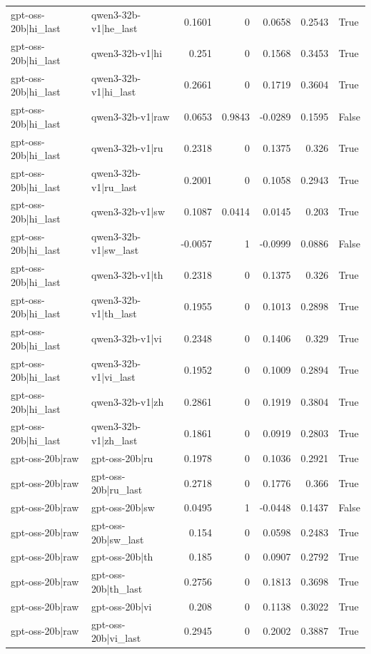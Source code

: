 \begin{table}
\begin{tabular}{l l r r r r l}
gpt-oss-20b|hi_last & qwen3-32b-v1|he_last & 0.1601 & 0 & 0.0658 & 0.2543 & True \\
gpt-oss-20b|hi_last & qwen3-32b-v1|hi & 0.251 & 0 & 0.1568 & 0.3453 & True \\
gpt-oss-20b|hi_last & qwen3-32b-v1|hi_last & 0.2661 & 0 & 0.1719 & 0.3604 & True \\
gpt-oss-20b|hi_last & qwen3-32b-v1|raw & 0.0653 & 0.9843 & -0.0289 & 0.1595 & False \\
gpt-oss-20b|hi_last & qwen3-32b-v1|ru & 0.2318 & 0 & 0.1375 & 0.326 & True \\
gpt-oss-20b|hi_last & qwen3-32b-v1|ru_last & 0.2001 & 0 & 0.1058 & 0.2943 & True \\
gpt-oss-20b|hi_last & qwen3-32b-v1|sw & 0.1087 & 0.0414 & 0.0145 & 0.203 & True \\
gpt-oss-20b|hi_last & qwen3-32b-v1|sw_last & -0.0057 & 1 & -0.0999 & 0.0886 & False \\
gpt-oss-20b|hi_last & qwen3-32b-v1|th & 0.2318 & 0 & 0.1375 & 0.326 & True \\
gpt-oss-20b|hi_last & qwen3-32b-v1|th_last & 0.1955 & 0 & 0.1013 & 0.2898 & True \\
gpt-oss-20b|hi_last & qwen3-32b-v1|vi & 0.2348 & 0 & 0.1406 & 0.329 & True \\
gpt-oss-20b|hi_last & qwen3-32b-v1|vi_last & 0.1952 & 0 & 0.1009 & 0.2894 & True \\
gpt-oss-20b|hi_last & qwen3-32b-v1|zh & 0.2861 & 0 & 0.1919 & 0.3804 & True \\
gpt-oss-20b|hi_last & qwen3-32b-v1|zh_last & 0.1861 & 0 & 0.0919 & 0.2803 & True \\
gpt-oss-20b|raw & gpt-oss-20b|ru & 0.1978 & 0 & 0.1036 & 0.2921 & True \\
gpt-oss-20b|raw & gpt-oss-20b|ru_last & 0.2718 & 0 & 0.1776 & 0.366 & True \\
gpt-oss-20b|raw & gpt-oss-20b|sw & 0.0495 & 1 & -0.0448 & 0.1437 & False \\
gpt-oss-20b|raw & gpt-oss-20b|sw_last & 0.154 & 0 & 0.0598 & 0.2483 & True \\
gpt-oss-20b|raw & gpt-oss-20b|th & 0.185 & 0 & 0.0907 & 0.2792 & True \\
gpt-oss-20b|raw & gpt-oss-20b|th_last & 0.2756 & 0 & 0.1813 & 0.3698 & True \\
gpt-oss-20b|raw & gpt-oss-20b|vi & 0.208 & 0 & 0.1138 & 0.3022 & True \\
gpt-oss-20b|raw & gpt-oss-20b|vi_last & 0.2945 & 0 & 0.2002 & 0.3887 & True \\

\end{tabular}
\end{table}
